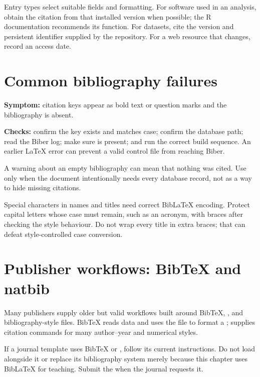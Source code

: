 Entry types select suitable fields and formatting. For software used in an
analysis, obtain the citation from that installed version when possible; the R
documentation recommends its  function. For datasets, cite
the version and persistent identifier supplied by the repository. For a web
resource that changes, record an access date.

\section{Common bibliography failures}

\begin{commonerror}
\textbf{Symptom:} citation keys appear as bold text or question marks and the
bibliography is absent.

\textbf{Checks:} confirm the key exists and matches case; confirm the database
path; read the Biber log; make sure  is present; and run
the correct build sequence. An earlier \LaTeX{} error can prevent a valid control
file from reaching Biber.
\end{commonerror}

A warning about an empty bibliography can mean that nothing was cited. Use
\required{*} only when the document intentionally needs every
database record, not as a way to hide missing citations.

Special characters in names and titles need correct Bib\LaTeX{} encoding. Protect
capital letters whose case must remain, such as an acronym, with braces after
checking the style behaviour. Do not wrap every title in extra braces; that can
defeat style-controlled case conversion.

\section{Publisher workflows: BibTeX and natbib}

Many publishers supply older but valid workflows built around BibTeX,
, and  bibliography-style files. BibTeX reads
 data and uses the  file to format a ;
 supplies citation commands for many author--year and numerical
styles.

\begin{submissioncheck}
If a journal template uses BibTeX or , follow its current
instructions. Do not load  alongside it or replace its
bibliography system merely because this chapter uses Bib\LaTeX{} for teaching.
Submit the  when the journal requests it.
\end{submissioncheck}

